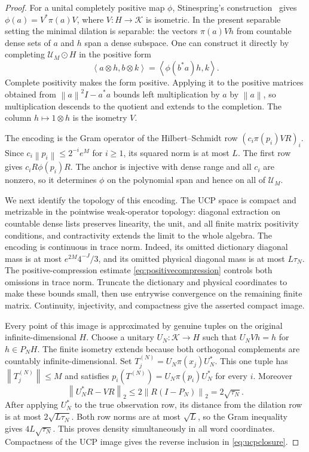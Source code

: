 \documentclass[11pt,a4paper]{amsart}
\numberwithin{equation}{section}
\theoremstyle{definition}
\theoremstyle{remark}
\newcommand{\norm}[1]{\left\lVert#1\right\rVert}
\newcommand{\ip}[2]{\left\langle#1,#2\right\rangle}
\begin{document}
\begin{proof}
For a unital completely positive map $\phi$, Stinespring's construction~\cite{Stinespring} gives $\phi(a)=V^*\pi(a)V$, where $V:H\to\mathcal K$ is isometric. In the present separable setting the minimal dilation is separable: the vectors $\pi(a)Vh$ from countable dense sets of $a$ and $h$ span a dense subspace. One can construct it directly by completing $\mathcal U_M\odot H$ in the positive form
\[
 \ip{a\otimes h}{b\otimes k}=\ip{\phi(b^*a)h}k.
\]
Complete positivity makes the form positive. Applying it to the positive matrices obtained from $\norm a^2I-a^*a$ bounds left multiplication by $a$ by $\norm a$, so multiplication descends to the quotient and extends to the completion. The column $h\mapsto1\otimes h$ is the isometry $V$.

The encoding is the Gram operator of the Hilbert--Schmidt row $(c_i\pi(p_i)VR)_i$. Since $c_i\norm{p_i}\le2^{-i}e^M$ for $i\ge1$, its squared norm is at most $L$. The first row gives $c_iR\phi(p_i)R$. The anchor is injective with dense range and all $c_i$ are nonzero, so it determines $\phi$ on the polynomial span and hence on all of $\mathcal U_M$.

We next identify the topology of this encoding. The UCP space is compact and metrizable in the pointwise weak-operator topology: diagonal extraction on countable dense lists preserves linearity, the unit, and all finite matrix positivity conditions, and contractivity extends the limit to the whole algebra. The encoding is continuous in trace norm. Indeed, its omitted dictionary diagonal mass is at most $e^{2M}4^{-J}/3$, and its omitted physical diagonal mass is at most $L\tau_N$. The positive-compression estimate \eqref{eq:positivecompression} controls both omissions in trace norm. Truncate the dictionary and physical coordinates to make these bounds small, then use entrywise convergence on the remaining finite matrix. Continuity, injectivity, and compactness give the asserted compact image.

Every point of this image is approximated by genuine tuples on the original infinite-dimensional $H$. Choose a unitary $U_N:\mathcal K\to H$ such that $U_NVh=h$ for $h\in P_NH$. The finite isometry extends because both orthogonal complements are countably infinite-dimensional. Set $T_j^{(N)}=U_N\pi(x_j)U_N^*$. This one tuple has $\norm{T_j^{(N)}}\le M$ and satisfies $p_i(T^{(N)})=U_N\pi(p_i)U_N^*$ for every $i$. Moreover
\[
 \norm{U_N^*R-VR}_2\le2\norm{R(I-P_N)}_2=2\sqrt{\tau_N}.
\]
After applying $U_N^*$ to the true observation row, its distance from the dilation row is at most $2\sqrt{L\tau_N}$. Both row norms are at most $\sqrt L$, so the Gram inequality gives $4L\sqrt{\tau_N}$. This proves density simultaneously in all word coordinates. Compactness of the UCP image gives the reverse inclusion in \eqref{eq:ucpclosure}.


\end{proof}
\end{document}
